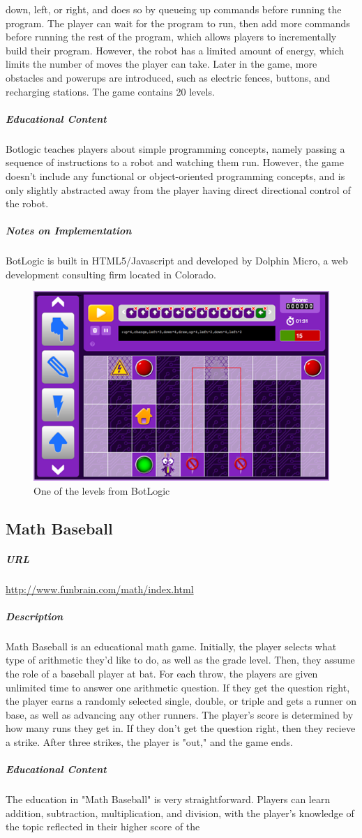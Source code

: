 down, left, or right, and does so by queueing up commands before running the program. The player can wait for the program to run, then add more commands before running the rest of the program, which allows players to incrementally build their program. However, the robot has a limited amount of energy, which limits the number of moves the player can take. Later in the game, more obstacles and powerups are introduced, such as electric fences, buttons, and recharging stations. The game contains 20 levels.\subparagraph{Educational Content}Botlogic teaches players about simple programming concepts, namely passing a sequence of instructions to a robot and watching them run. However, the game doesn't include any functional or object-oriented programming concepts, and is only slightly abstracted away from the player having direct directional control of the robot.\subparagraph{Notes on Implementation}BotLogic is built in HTML5/Javascript and developed by Dolphin Micro, a web development consulting firm located in Colorado.\begin{figure}[p]\centering \includegraphics[height=.4\textheight, width=\textwidth, keepaspectratio=true]{img/botlogic_screen.png}\caption{One of the levels from BotLogic}\end{figure}\subsection{Math Baseball}\subparagraph{URL}\url{http://www.funbrain.com/math/index.html}\subparagraph{Description}Math Baseball is an educational math game. Initially, the player selects what type of arithmetic they'd like to do, as well as the grade level. Then, they assume the role of a baseball player at bat. For each throw, the players are given unlimited time to answer one arithmetic question. If they get the question right, the player earns a randomly selected single, double, or triple and gets a runner on base, as well as advancing any other runners. The player's score is determined by how many runs they get in. If they don't get the question right, then they recieve a strike. After three strikes, the player is "out," and the game ends.\subparagraph{Educational Content}The education in "Math Baseball" is very straightforward. Players can learn addition, subtraction, multiplication, and division, with the player's knowledge of the topic reflected in their higher score of the 